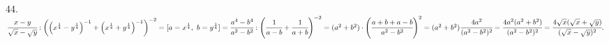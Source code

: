 44. $\cfrac{x-y}{\sqrt{x}-\sqrt{y}}:\left(\left(x^\frac{1}{4}-y^\frac{1}{4}\right)^{-1}+\left(x^\frac{1}{4}+y^\frac{1}{4}\right)^{-1}\right)^{-2}=[a=x^{\frac{1}{4}},\ b=y^\frac{1}{4}]=\cfrac{a^4-b^4}{a^2-b^2}:\left(\cfrac{1}{a-b}+\cfrac{1}{a+b}\right)^{-2}=
(a^2+b^2)\cdot\left(\cfrac{a+b+a-b}{a^2-b^2}\right)^{2}=(a^2+b^2)\cfrac{4a^2}{(a^2-b^2)^2}=\cfrac{4a^2(a^2+b^2)}{(a^2-b^2)^2}=\cfrac{4\sqrt{x}(\sqrt{x}+\sqrt{y})}{(\sqrt{x}-\sqrt{y})^2}.$\\
